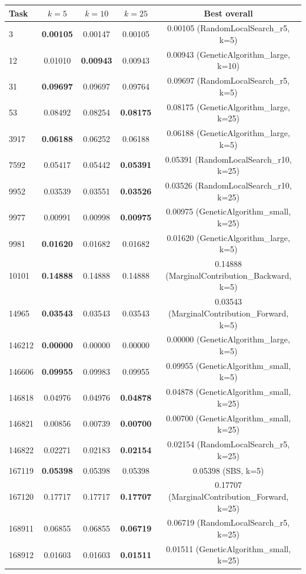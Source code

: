 \scriptsize
\begin{tabular}{lcccc}
\toprule
Task & $k=5$ & $k=10$ & $k=25$ & Best overall \\
\midrule
3 & \textbf{0.00105} & 0.00147 & 0.00105 & 0.00105 (RandomLocalSearch\_r5, k=5) \\
12 & 0.01010 & \textbf{0.00943} & 0.00943 & 0.00943 (GeneticAlgorithm\_large, k=10) \\
31 & \textbf{0.09697} & 0.09697 & 0.09764 & 0.09697 (RandomLocalSearch\_r5, k=5) \\
53 & 0.08492 & 0.08254 & \textbf{0.08175} & 0.08175 (GeneticAlgorithm\_large, k=25) \\
3917 & \textbf{0.06188} & 0.06252 & 0.06188 & 0.06188 (GeneticAlgorithm\_large, k=5) \\
7592 & 0.05417 & 0.05442 & \textbf{0.05391} & 0.05391 (RandomLocalSearch\_r10, k=25) \\
9952 & 0.03539 & 0.03551 & \textbf{0.03526} & 0.03526 (RandomLocalSearch\_r10, k=25) \\
9977 & 0.00991 & 0.00998 & \textbf{0.00975} & 0.00975 (GeneticAlgorithm\_small, k=25) \\
9981 & \textbf{0.01620} & 0.01682 & 0.01682 & 0.01620 (GeneticAlgorithm\_large, k=5) \\
10101 & \textbf{0.14888} & 0.14888 & 0.14888 & 0.14888 (MarginalContribution\_Backward, k=5) \\
14965 & \textbf{0.03543} & 0.03543 & 0.03543 & 0.03543 (MarginalContribution\_Forward, k=5) \\
146212 & \textbf{0.00000} & 0.00000 & 0.00000 & 0.00000 (GeneticAlgorithm\_large, k=5) \\
146606 & \textbf{0.09955} & 0.09983 & 0.09955 & 0.09955 (GeneticAlgorithm\_small, k=5) \\
146818 & 0.04976 & 0.04976 & \textbf{0.04878} & 0.04878 (GeneticAlgorithm\_small, k=25) \\
146821 & 0.00856 & 0.00739 & \textbf{0.00700} & 0.00700 (GeneticAlgorithm\_small, k=25) \\
146822 & 0.02271 & 0.02183 & \textbf{0.02154} & 0.02154 (RandomLocalSearch\_r5, k=25) \\
167119 & \textbf{0.05398} & 0.05398 & 0.05398 & 0.05398 (SBS, k=5) \\
167120 & 0.17717 & 0.17717 & \textbf{0.17707} & 0.17707 (MarginalContribution\_Forward, k=25) \\
168911 & 0.06855 & 0.06855 & \textbf{0.06719} & 0.06719 (RandomLocalSearch\_r5, k=25) \\
168912 & 0.01603 & 0.01603 & \textbf{0.01511} & 0.01511 (GeneticAlgorithm\_small, k=25) \\
\bottomrule
\end{tabular}
